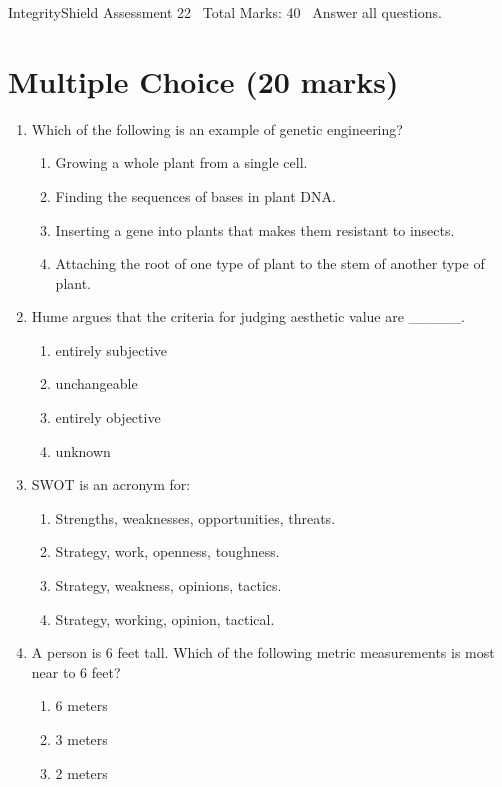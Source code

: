 \documentclass[12pt]{article}
\begin{document}
\begin{center}
IntegrityShield Assessment 22 \
Total Marks: 40 \
Answer all questions.
\end{center}

\section*{Multiple Choice (20 marks)}
\begin{enumerate}[label=\arabic*.]
\item Which of the following is an example of genetic engineering?
\begin{enumerate}[label=(\alph*)]
    \item Growing a whole plant from a single cell.
    \item Finding the sequences of bases in plant DNA.
    \item Inserting a gene into plants that makes them resistant to insects.
    \item Attaching the root of one type of plant to the stem of another type of plant.
\end{enumerate}
\item Hume argues that the criteria for judging aesthetic value are \_\_\_\_\_.
\begin{enumerate}[label=(\alph*)]
    \item entirely subjective
    \item unchangeable
    \item entirely objective
    \item unknown
\end{enumerate}
\item SWOT is an acronym for:
\begin{enumerate}[label=(\alph*)]
    \item Strengths, weaknesses, opportunities, threats.
    \item Strategy, work, openness, toughness.
    \item Strategy, weakness, opinions, tactics.
    \item Strategy, working, opinion, tactical.
\end{enumerate}
\item A person is 6 feet tall. Which of the following metric measurements is most near to 6 feet?
\begin{enumerate}[label=(\alph*)]
    \item 6 meters
    \item 3 meters
    \item 2 meters

\end{enumerate}
\end{enumerate}
\end{document}
